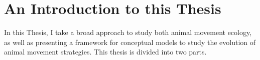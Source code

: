 
\section*{An Introduction to this Thesis}

In this Thesis, I take a broad approach to study both animal movement ecology, as well as presenting a framework for conceptual models to study the evolution of animal movement strategies. This thesis is divided into two parts.

